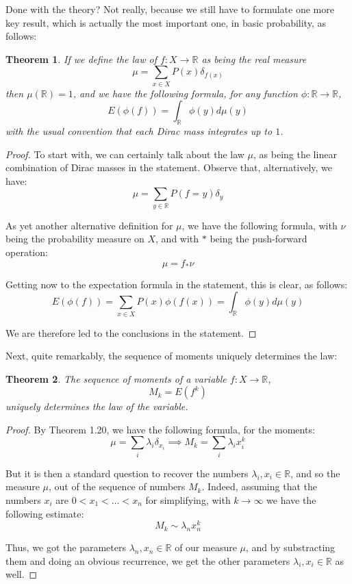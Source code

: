 \documentclass[12pt]{amsbook}
\newtheorem{theorem}{Theorem}[chapter]
\begin{document}
\bigskip

Done with the theory? Not really, because we still have to formulate one more key result, which is actually the most important one, in basic probability, as follows:


\begin{theorem}
If we define the law of $f:X\to\mathbb R$ as being the real measure
$$\mu=\sum_{x\in X}P(x)\delta_{f(x)}$$
then $\mu(\mathbb R)=1$, and we have the following formula, for any function $\phi:\mathbb R\to\mathbb R$,
$$E(\phi(f))=\int_\mathbb R\phi(y)d\mu(y)$$
with the usual convention that each Dirac mass integrates up to $1$.
\end{theorem} 

\begin{proof}
To start with, we can certainly talk about the law $\mu$, as being the linear combination of Dirac masses in the statement. Observe that, alternatively, we have:
$$\mu=\sum_{y\in\mathbb R}P(f=y)\delta_y$$

As yet another alternative definition for $\mu$, we have the following formula, with $\nu$ being the probability measure on $X$, and with $*$ being the push-forward operation:
$$\mu=f_*\nu$$

Getting now to the expectation formula in the statement, this is clear, as follows:
$$E(\phi(f))
=\sum_{x\in X}P(x)\phi(f(x))
=\int_\mathbb R\phi(y)d\mu(y)$$

We are therefore led to the conclusions in the statement.
\end{proof}

Next, quite remarkably, the sequence of moments uniquely determines the law:

\begin{theorem}
The sequence of moments of a variable $f:X\to\mathbb R$,
$$M_k=E(f^k)$$
uniquely determines the law of the variable.
\end{theorem}

\begin{proof}
By Theorem 1.20, we have the following formula, for the moments:
$$\mu=\sum_i\lambda_i\delta_{x_i}\implies M_k=\sum_i\lambda_ix_i^k$$

But it is then a standard question to recover the numbers $\lambda_i,x_i\in\mathbb R$, and so the measure $\mu$, out of the sequence of numbers $M_k$. Indeed, assuming that the numbers $x_i$ are $0<x_1<\ldots<x_n$ for simplifying, with $k\to\infty$ we have the following estimate:
$$M_k\sim\lambda_nx_n^k$$

Thus, we got the parameters $\lambda_n,x_n\in\mathbb R$ of our measure $\mu$, and by substracting them and doing an obvious recurrence, we get the other parameters $\lambda_i,x_i\in\mathbb R$ as well.
\end{proof}
\end{document}
